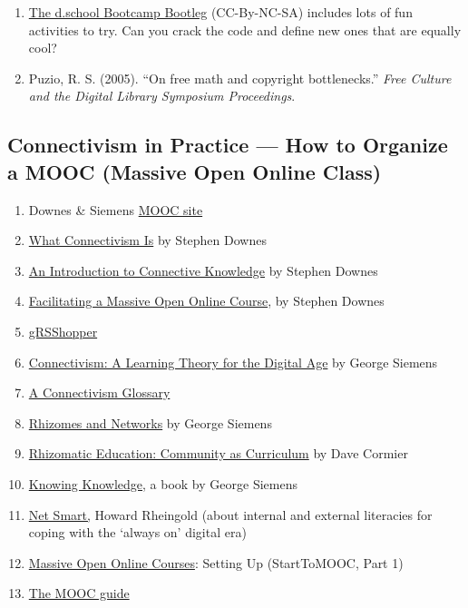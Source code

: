 \begin{enumerate}
\item
  \href{http://dschool.stanford.edu/wp-content/uploads/2011/03/BootcampBootleg2010v2SLIM.pdf}{The
  d.school Bootcamp Bootleg} (CC-By-NC-SA) includes lots of fun
  activities to try. Can you crack the code and define new ones that are
  equally cool?
\item
  Puzio, R. S. (2005). ``On free math and copyright bottlenecks.''
  \emph{Free Culture and the Digital Library Symposium Proceedings}.
\end{enumerate}
\subsection{Connectivism in Practice --- How to Organize a MOOC (Massive
Open Online Class)}

\begin{enumerate}
\item
  Downes \& Siemens \href{http://change.mooc.ca}{MOOC site}
\item
  \href{http://halfanhour.blogspot.com/2007/02/what-connectivism-is.html}{What
  Connectivism Is} by Stephen Downes
\item
  \href{http://www.downes.ca/post/33034}{An Introduction to Connective
  Knowledge} by Stephen Downes
\item
  \href{http://www.downes.ca/presentation/290}{Facilitating a Massive
  Open Online Course}, by Stephen Downes
\item
  \href{http://grsshopper.downes.ca/index.html}{gRSShopper}
\item
  \href{\%20http://www.elearnspace.org/Articles/connectivism.htm}{Connectivism:
  A Learning Theory for the Digital Age} by George Siemens
\item
  \href{http://en.wikiversity.org/wiki/Connectivism\_glossary}{A
  Connectivism Glossary}
\item
  \href{http://www.connectivism.ca/?p=329}{Rhizomes and Networks} by
  George Siemens
\item
  \href{http://innovateonline.info/pdf/vol4\_issue5/Rhizomatic\_Education-\_\_Community\_as\_Curriculum.pdf}{Rhizomatic
  Education: Community as Curriculum} by Dave Cormier
\item
  \href{http://www.amazon.ca/Knowing-Knowledge-George-Siemens/dp/1430302305}{Knowing
  Knowledge}, a book by George Siemens
\item
  \href{http://www.amazon.com/Net-Smart-ebook/dp/B007D5UP9G}{Net Smart,}
  Howard Rheingold (about internal and external literacies for coping
  with the `always on' digital era)
\item
  \href{http://www.learningsolutionsmag.com/articles/886/}{Massive Open
  Online Courses}: Setting Up (StartToMOOC, Part 1)
\item
  \href{https://sites.google.com/site/themoocguide/}{The MOOC guide}
\end{enumerate}
